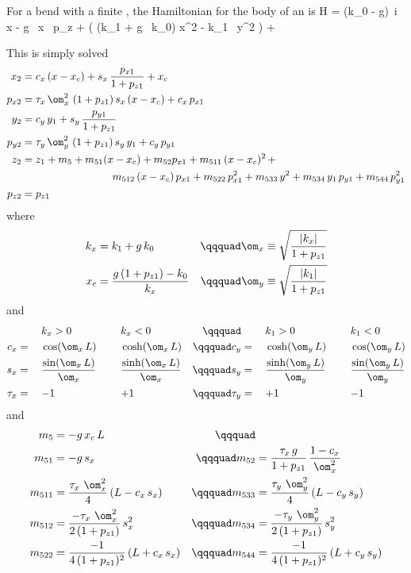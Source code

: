 For a bend with a finite , the Hamiltonian for the body of an  is
\Begineq
  H = (k_0 - g) \,i x - g \, x \, p_z + 
  \left( (k_1 + g \, k_0) x^2 - k_1 \, y^2 \right) +
\Endeq

This is simply solved
\begin{align}
  x_2    &= c_x \, (x - x_c) + s_x \, \frac{p_{x1}}{1 + p_{z1}} + x_c \CRNO
  p_{x2} &= \tau_x \, \om_x^2 \, \, (1 + p_{z1}) \, s_x \, (x -x_c) + c_x \, p_{x1} \CRNO
  y_2    &= c_y \, y_1 + s_y \, \frac{p_{y1}}{1 + p_{z1}} \CRNO
  p_{y2} &= \tau_y \, \om_y^2 \, \, (1 + p_{z1}) \, s_y \, y_1 + c_y \, p_{y1} \\
  z_2    &= z_1 + m_5 + m_{51} (x - x_c) + m_{52} p_{x1} + m_{511} \, (x-x_c)^2 \, + \CRNO
         &\hspace*{20ex} m_{512} \, (x-x_c) \, p_{x1} + m_{522} \, p_{x1}^2 + 
                         m_{533} \, y^2 + m_{534} \, y_1 \, p_{y1} + m_{544} \, p_{y1}^2 \CRNO
  p_{z2} &= p_{z1} \nonumber
\end{align}
where 
\begin{alignat}{2}
  k_x &= k_1 + g \, k_0 & \qqquad
  \om_x &\equiv \sqrt{\frac{|k_x|}{1 + p_{z1}}} \CRNO
  x_c &= \frac{g \, (1 + p_{z1}) - k_0}{k_x} & \qqquad
  \om_y &\equiv \sqrt{\frac{|k_1|}{1 + p_{z1}}} 
\end{alignat}
and
\begin{alignat}{6}
         &\hspace*{3ex}  && k_x > 0          &\hspace*{3ex}& k_x < 0 & \qqquad
         &\hspace*{3ex}  && k_1 > 0          &\hspace*{3ex}& k_1 < 0 \CRNO
     c_x &=   && \cos  (\om_x \, L)               && \cosh (\om_x \, L) & \qqquad
     c_y &=   && \cosh (\om_y \, L)               && \cos  (\om_y \, L) \CRNO
     s_x &=   && \frac{\sin  (\om_x \, L)}{\om_x} && \frac{\sinh (\om_x \, L)}{\om_x} & \qqquad
     s_y &=   && \frac{\sinh (\om_y \, L)}{\om_y} && \frac{\sin  (\om_y \, L)}{\om_y} \\
  \tau_x &=   && {-}1             && {+}1             & \qqquad
  \tau_y &=   && {+}1             && {-}1             \nonumber
\end{alignat}
and
\begin{alignat}{2}
  m_5     &= -g \, x_c \, L & \qqquad & \CRNO
  m_{51}  &= -g \, s_x & \qqquad
  m_{52}  &= \frac{\tau_x \, g}{1 + p_{z1}} \, \frac{1 - c_x}{\om_x^2} \CRNO
  m_{511} &= \frac{\tau_x \,\, \om_x^2}{4} \, (L - c_x \, s_x) & \qqquad
  m_{533} &= \frac{\tau_y \,\, \om_y^2}{4} \, (L - c_y \, s_y) \CRNO
  m_{512} &= \frac{-\tau_x \,\, \om_x^2}{2 \, (1 + p_{z1})} \, s_x^2 & \qqquad
  m_{534} &= \frac{-\tau_y \,\, \om_y^2}{2 \, (1 + p_{z1})} \, s_y^2 \CRNO
  m_{522} &= \frac{-1}{4 \, (1 + p_{z1})^2} \, (L + c_x \, s_x) & \qqquad
  m_{544} &= \frac{-1}{4 \, (1 + p_{z1})^2} \, (L + c_y \, s_y) \nonumber
\end{alignat}

